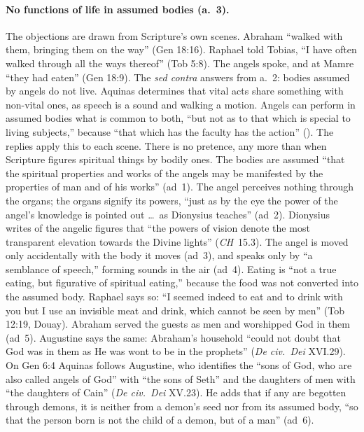 \paragraph{No functions of life in assumed bodies (a.~3).} The objections
are drawn from Scripture's own scenes. Abraham ``walked with them, bringing
them on the way'' (Gen 18:16). Raphael told Tobias, ``I have often walked
through all the ways thereof'' (Tob 5:8). The angels spoke, and at Mamre
``they had eaten'' (Gen 18:9). The \emph{sed contra} answers from a.~2:
bodies assumed by angels do not live. Aquinas determines that vital acts
share something with non-vital ones, as speech is a sound and walking a
motion. Angels can perform in assumed bodies what is common to both, ``but
not as to that which is special to living subjects,'' because ``that which
has the faculty has the action'' (). The replies apply this to each scene. There is no pretence, any
more than when Scripture figures spiritual things by bodily ones. The
bodies are assumed ``that the spiritual properties and works of the angels
may be manifested by the properties of man and of his works'' (ad~1). The
angel perceives nothing through the organs; the organs signify its powers,
``just as by the eye the power of the angel's knowledge is pointed out
\dots\ as Dionysius teaches'' (ad~2). Dionysius writes of the angelic
figures that ``the powers of vision denote the most transparent elevation
towards the Divine lights'' (\emph{CH}~15.3). The angel is moved only
accidentally with the body it moves (ad~3), and speaks only by ``a
semblance of speech,'' forming sounds in the air (ad~4). Eating is
``not a true eating, but figurative of spiritual eating,'' because the food
was not converted into the assumed body. Raphael says so: ``I seemed indeed
to eat and to drink with you but I use an invisible meat and drink, which
cannot be seen by men'' (Tob 12:19, Douay). Abraham served the guests as
men and worshipped God in them (ad~5). Augustine says the same: Abraham's household ``could not doubt that God was in them as He was
wont to be in the prophets'' (\emph{De civ.\ Dei} XVI.29). On Gen 6:4
Aquinas follows Augustine, who identifies the ``sons of God, who are also
called angels of God'' with ``the sons of Seth'' and the daughters of men
with ``the daughters of Cain'' (\emph{De civ.\ Dei} XV.23). He adds that
if any are begotten through demons, it is neither from a demon's seed nor
from its assumed body, ``so that the person born is not the child of a
demon, but of a man'' (ad~6).

